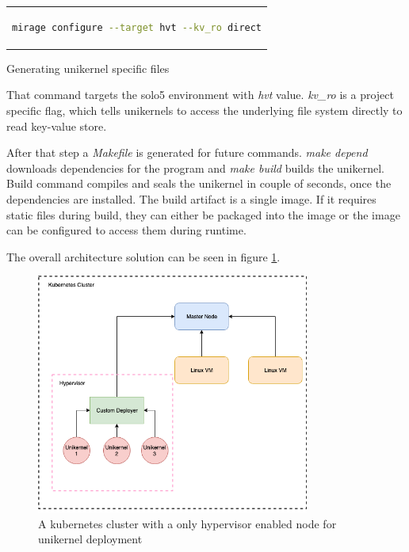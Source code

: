 \begin{code}[htpb]
    \centering
    \begin{tabular}{c}
    \begin{lstlisting}[language=bash]
      mirage configure --target hvt --kv_ro direct
  \end{lstlisting}
  \end{tabular}
  \caption{Generating unikernel specific files}\label{fig:mirage_configure}
\end{code}

That command targets the solo5 environment with \textit{hvt} value. \textit{kv\_ro} is a project specific flag, which tells unikernels to access the underlying file system directly to read key-value store.

After that step a \textit{Makefile} is generated for future commands. \textit{make depend} downloads dependencies for the program and \textit{make build} builds the unikernel. Build command compiles and seals the unikernel in couple of seconds, once the dependencies are installed. The build artifact is a single image. If it requires static files during build, they can either be packaged into the image or the image can be configured to access them during runtime.

The overall architecture solution can be seen in figure \ref{fig:hypervisor}.


\begin{figure}[htpb]
  \centering
  \includegraphics[width=0.8\textwidth]{figures/arch3.png}
  \caption{A kubernetes cluster with a only hypervisor enabled node for unikernel deployment} \label{fig:hypervisor}
\end{figure}
